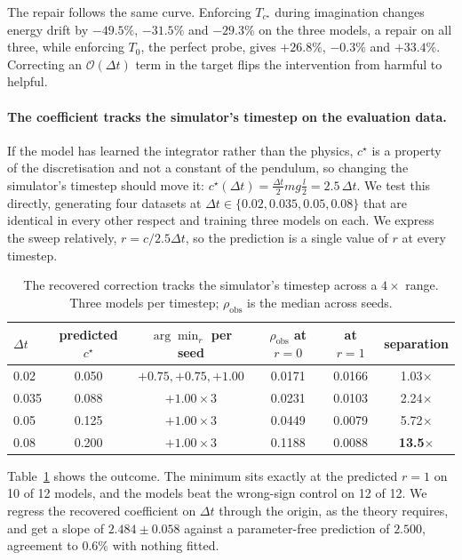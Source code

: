 The repair follows the same curve. Enforcing $T_{c^\star}$ during imagination changes energy drift by
$-49.5\%$, $-31.5\%$ and $-29.3\%$ on the three models, a repair on all three, while enforcing
$T_0$, the perfect probe, gives $+26.8\%$, $-0.3\%$ and $+33.4\%$. Correcting an
$\mathcal{O}(\Delta t)$ term in the target flips the intervention from harmful to helpful.

\paragraph{The coefficient tracks the simulator's timestep on the evaluation data.}
If the model has learned the integrator rather than the physics, $c^\star$ is a property of the
discretisation and not a constant of the pendulum, so changing the simulator's timestep should move
it: $c^\star(\Delta t) = \tfrac{\Delta t}{2}mg\tfrac{l}{2} = 2.5\,\Delta t$. We test this directly,
generating four datasets at $\Delta t \in \{0.02, 0.035, 0.05, 0.08\}$ that are identical in every
other respect and training three models on each. We express the sweep relatively,
$r = c/2.5\Delta t$, so the prediction is a single value of $r$ at every timestep.

\begin{table}[t]
\centering\small
\caption{The recovered correction tracks the simulator's timestep across a $4\times$ range. Three
models per timestep; $\rho_{\mathrm{obs}}$ is the median across seeds.}
\label{tab:timestep}
\begin{tabular}{lccccc}
\toprule
$\Delta t$ & predicted $c^\star$ & $\arg\min_r$ per seed & $\rho_{\mathrm{obs}}$ at $r{=}0$ & at $r{=}1$ & separation \\
\midrule
0.02  & 0.050 & $+0.75,+0.75,+1.00$ & 0.0171 & 0.0166 & 1.03$\times$ \\
0.035 & 0.088 & $+1.00\times3$ & 0.0231 & 0.0103 & 2.24$\times$ \\
0.05  & 0.125 & $+1.00\times3$ & 0.0449 & 0.0079 & 5.72$\times$ \\
0.08  & 0.200 & $+1.00\times3$ & 0.1188 & 0.0088 & \textbf{13.5}$\times$ \\
\bottomrule
\end{tabular}
\end{table}

Table~\ref{tab:timestep} shows the outcome. The minimum sits exactly at the predicted $r=1$ on 10 of
12 models, and the models beat the wrong-sign control on 12 of 12. We regress the recovered
coefficient on $\Delta t$ through the origin, as the theory requires, and get a slope of
$2.484 \pm 0.058$ against a parameter-free prediction of $2.500$, agreement to $0.6\%$ with nothing
fitted.

